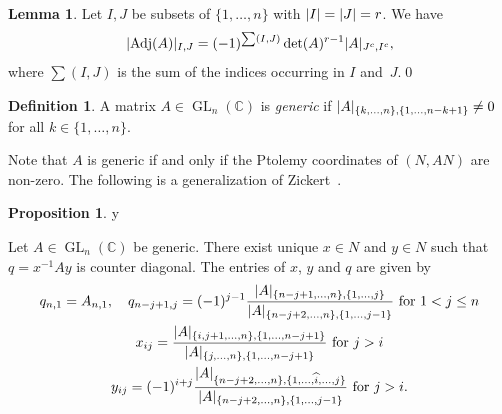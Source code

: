 \documentclass[11pt]{amsart}
\theoremstyle{definition}
\newtheorem{proposition}[theorem]{Proposition}
\newtheorem{lemma}[theorem]{Lemma}
\newtheorem{definition}[theorem]{Definition}
\numberwithin{equation}{section}
\def\printname#1{
        \if\draft y
                \smash{\makebox[0pt]{\hspace{-0.5in}
                        \raisebox{8pt}{\tt\tiny #1}}}
        \fi
}
\def\lbl#1{\label{#1}\printname{#1}}
\DeclareMathOperator{\GL}{GL}
\DeclareMathOperator{\Adj}{Adj}
\DeclarePairedDelimiter{\Norm}{\lvert}{\rvert}
\newcommand{\C}{\mathbb C}
\begin{document}
\begin{lemma} 
Let $I,J$ be subsets of $\{1,\dots,n\}$ with $\Norm{I}=\Norm{J}=r$. We have
\begin{equation}\lbl{Jacobi}
\Norm{\Adj(A)}_{I,J}=(-1)^{\sum(I,J)}\det(A)^{r-1}\Norm{A}_{J^c,I^c},
\end{equation}
where $\sum(I,J)$ is the sum of the indices occurring  in $I$ and~$J$.\qed
\end{lemma}

\begin{definition} 
A matrix $A\in\GL_n(\C)$ is \emph{generic} if 
$\Norm{A}_{\{k,\dots,n\},\{1,\dots,n-k+1\}}\neq 0$ for all $k\in\{1,\dots,n\}$.
\end{definition}

Note that $A$ is generic if and only if the Ptolemy coordinates of $(N,AN)$ 
are non-zero. The following is a generalization of 
Zickert~\cite[Lemma~3.5]{ZickertDuke}.

\begin{proposition}
\lbl{xyqExistence} 
Let $A\in \GL_n(\C)$ be generic. There exist unique $x\in N$ and $y\in N$ 
such that $q=x^{-1}Ay$ is counter diagonal. The entries of $x$, $y$ and $q$ 
are given by
\begin{gather} 
q_{n,1}=A_{n,1}, \quad q_{n-j+1,j}=(-1)^{j-1}
\frac{\Norm{A}_{\{n-j+1,\dots,n\},\{1,\dots, j\}}}{\Norm{A}_{\{n-j+2,\dots,n\},\{1,\dots,j-1\}}} 
\text{ for }1<j\leq n\lbl{q}\\
x_{ij}=\frac{\Norm{A}_{\{i,j+1,\dots,n\},\{1,\dots,n-j+1\}}}{
\Norm{A}_{\{j,\dots,n\},\{1,\dots,n-j+1\}}} \text{ for $j>i$}\lbl{x}\\
y_{ij}=(-1)^{i+j}\frac{\Norm{A}_{\{n-j+2,\dots,n\},\{1,\dots,\widehat i,\dots,j\}}}{
\Norm{A}_{\{n-j+2,\dots,n\},\{1,\dots,j-1\}}} \text{ for $j>i$}\lbl{y}.
\end{gather}
\end{proposition}
\end{document}
